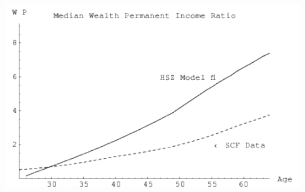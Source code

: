 \documentclass{article}
\begin{document}
	\centerline{\includegraphics{./Figures/MedianWProfilesHSZvsSCF}}
      
\end{document}
